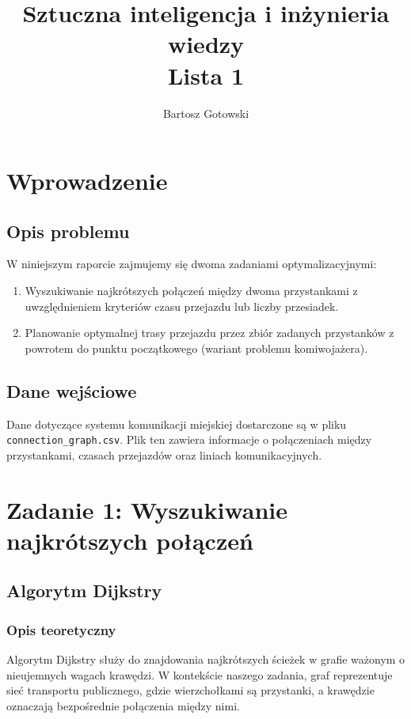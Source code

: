 \documentclass[12pt,a4paper]{article}
\title{\LARGE \textbf{Sztuczna inteligencja i inżynieria wiedzy}\\
\large Lista 1}
\author{Bartosz Gotowski}
\begin{document}
\maketitle

\tableofcontents
\newpage

\section{Wprowadzenie}
\subsection{Opis problemu}
W niniejszym raporcie zajmujemy się dwoma zadaniami optymalizacyjnymi:
\begin{enumerate}
    \item Wyszukiwanie najkrótszych połączeń między dwoma przystankami z uwzględnieniem kryteriów czasu przejazdu lub liczby przesiadek.
    \item Planowanie optymalnej trasy przejazdu przez zbiór zadanych przystanków z powrotem do punktu początkowego (wariant problemu komiwojażera).
\end{enumerate}

\subsection{Dane wejściowe}
Dane dotyczące systemu komunikacji miejskiej dostarczone są w pliku \texttt{connection\_graph.csv}. Plik ten zawiera informacje o połączeniach między przystankami, czasach przejazdów oraz liniach komunikacyjnych.

\section{Zadanie 1: Wyszukiwanie najkrótszych połączeń}
\subsection{Algorytm Dijkstry}
\subsubsection{Opis teoretyczny}
Algorytm Dijkstry służy do znajdowania najkrótszych ścieżek w grafie ważonym o nieujemnych wagach krawędzi. W kontekście naszego zadania, graf reprezentuje sieć transportu publicznego, gdzie wierzchołkami są przystanki, a krawędzie oznaczają bezpośrednie połączenia między nimi.
\end{document}
